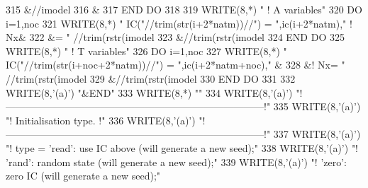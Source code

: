 \begin{DoxyCode}
{315         &//imodel%
316         &%
317 \textcolor{keywordflow}{    END DO}
318 
319     \textcolor{keyword}{WRITE}(8,*) \textcolor{stringliteral}{" ! A variables"}
320     \textcolor{keywordflow}{DO} i=1,noc
321       \textcolor{keyword}{WRITE}(8,*) \textcolor{stringliteral}{" IC("}//trim(str(i+2*natm))//\textcolor{stringliteral}{") = "},ic(i+2*natm),\textcolor{stringliteral}{"   ! Nx&}
322 \textcolor{stringliteral}{}\textcolor{stringliteral}{            &= "}      //trim(rstr(imodel%
323         &//trim(rstr(imodel%
324 \textcolor{keywordflow}{    END DO}
325     \textcolor{keyword}{WRITE}(8,*) \textcolor{stringliteral}{" ! T variables"}
326     \textcolor{keywordflow}{DO} i=1,noc
327       \textcolor{keyword}{WRITE}(8,*) \textcolor{stringliteral}{" IC("}//trim(str(i+noc+2*natm))//\textcolor{stringliteral}{") = "},ic(i+2*natm+noc),\textcolor{stringliteral}{"   &}
328 \textcolor{stringliteral}{}\textcolor{stringliteral}{            &! Nx= "}      //trim(rstr(imodel%
329         &//trim(rstr(imodel%
330 \textcolor{keywordflow}{    END DO}
331 
332     \textcolor{keyword}{WRITE}(8,\textcolor{stringliteral}{'(a)'}) \textcolor{stringliteral}{"&END"}
333     \textcolor{keyword}{WRITE}(8,*) \textcolor{stringliteral}{""}
334     \textcolor{keyword}{WRITE}(8,\textcolor{stringliteral}{'(a)'}) \textcolor{stringliteral}{"!------------------------------------------------------------------------------!"}
335     \textcolor{keyword}{WRITE}(8,\textcolor{stringliteral}{'(a)'}) \textcolor{stringliteral}{"! Initialisation type.                                                         !"}
336     \textcolor{keyword}{WRITE}(8,\textcolor{stringliteral}{'(a)'}) \textcolor{stringliteral}{"!------------------------------------------------------------------------------!"}
337     \textcolor{keyword}{WRITE}(8,\textcolor{stringliteral}{'(a)'}) \textcolor{stringliteral}{"! type = 'read': use IC above (will generate a new seed);"}
338     \textcolor{keyword}{WRITE}(8,\textcolor{stringliteral}{'(a)'}) \textcolor{stringliteral}{"!        'rand': random state (will generate a new seed);"}
339     \textcolor{keyword}{WRITE}(8,\textcolor{stringliteral}{'(a)'}) \textcolor{stringliteral}{"!        'zero': zero IC (will generate a new seed);"}
}
\end{DoxyCode}
